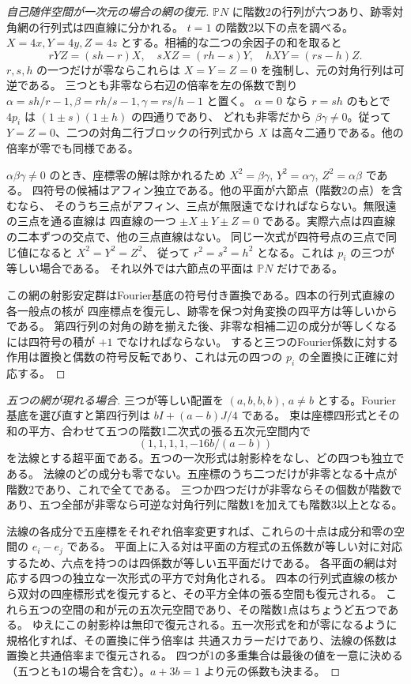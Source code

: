 \begin{proof}[自己随伴空間が一次元の場合の網の復元]
$\mathbb P N$ に階数2の行列が六つあり、跡零対角網の行列式は四直線に分かれる。
$t=1$ の階数2以下の点を調べる。$X=4x,Y=4y,Z=4z$ とする。相補的な二つの余因子の和を取ると
\[
 rYZ=(sh-r)X,\quad sXZ=(rh-s)Y,\quad hXY=(rs-h)Z .
\]
$ r,s,h$ の一つだけが零ならこれらは $X=Y=Z=0$ を強制し、元の対角行列は可逆である。
三つとも非零なら右辺の倍率を左の係数で割り $\alpha=sh/r-1,\beta=rh/s-1,\gamma=rs/h-1$ と置く。
$\alpha=0$ なら $r=sh$ のもとで $4p_i$ は $(1\pm s)(1\pm h)$ の四通りであり、
どれも非零だから $\beta\gamma\ne0$。従って $Y=Z=0$、二つの対角二行ブロックの行列式から
$X$ は高々二通りである。他の倍率が零でも同様である。

$\alpha\beta\gamma\ne0$ のとき、座標零の解は除かれるため
$X^2=\beta\gamma$, $Y^2=\alpha\gamma$, $Z^2=\alpha\beta$ である。
四符号の候補はアフィン独立である。他の平面が六節点（階数2の点）を含むなら、
そのうち三点がアフィン、三点が無限遠でなければならない。無限遠の三点を通る直線は
四直線の一つ $\pm X\pm Y\pm Z=0$ である。実際六点は四直線の二本ずつの交点で、他の三点直線はない。
同じ一次式が四符号点の三点で同じ値になると $X^2=Y^2=Z^2$、
従って $r^2=s^2=h^2$ となる。これは $p_i$ の三つが等しい場合である。
それ以外では六節点の平面は $\mathbb P N$ だけである。

この網の射影安定群はFourier基底の符号付き置換である。四本の行列式直線の各一般点の核が
四座標点を復元し、跡零を保つ対角変換の四平方は等しいからである。
第四行列の対角の跡を揃えた後、非零な相補二辺の成分が等しくなるには四符号の積が $+1$ でなければならない。
すると三つのFourier係数に対する作用は置換と偶数の符号反転であり、これは元の四つの $p_i$ の全置換に正確に対応する。
\end{proof}

\begin{proof}[五つの網が現れる場合]
三つが等しい配置を $(a,b,b,b)$, $a\ne b$ とする。Fourier基底を選び直すと第四行列は $bI+(a-b)J/4$ である。
束は座標四形式とその和の平方、合わせて五つの階数1二次式の張る五次元空間内で
\[
 (1,1,1,1,-16b/(a-b))
\]
を法線とする超平面である。五つの一次形式は射影枠をなし、どの四つも独立である。
法線のどの成分も零でない。五座標のうち二つだけが非零となる十点が階数2であり、これで全てである。
三つか四つだけが非零ならその個数が階数であり、五つ全部が非零なら可逆な対角行列に階数1を加えても階数3以上となる。

法線の各成分で五座標をそれぞれ倍率変更すれば、これらの十点は成分和零の空間の $e_i-e_j$ である。
平面上に入る対は平面の方程式の五係数が等しい対に対応するため、六点を持つのは四係数が等しい五平面だけである。
各平面の網は対応する四つの独立な一次形式の平方で対角化される。
四本の行列式直線の核から双対の四座標形式を復元すると、その平方全体の張る空間も復元される。
これら五つの空間の和が元の五次元空間であり、その階数1点はちょうど五つである。
ゆえにこの射影枠は無印で復元される。五一次形式を和が零になるように規格化すれば、その置換に伴う倍率は
共通スカラーだけであり、法線の係数は置換と共通倍率まで復元される。
四つが1の多重集合は最後の値を一意に決める（五つとも1の場合を含む）。$a+3b=1$ より元の係数も決まる。
\end{proof}

